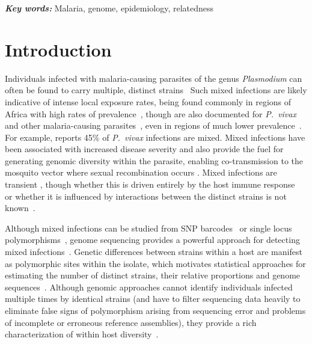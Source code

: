 \documentclass[9pt,lineno]{elife}
\providecommand{\keywords}[1]{\textbf{\textit{Key words:}} #1}
\begin{document}
\keywords{Malaria, genome, epidemiology, relatedness}


\section{Introduction}


Individuals infected with malaria-causing parasites of the genus {\it Plasmodium} can often be found to carry multiple, distinct strains~\citep{Bell2006}  Such mixed infections are likely indicative of intense local exposure rates, being found commonly in regions of Africa with high rates of prevalence~\citep{Bhatt2015, Howes2016}, though are also documented for {\it P.~vivax} and other malaria-causing parasites~\citep{Mueller2007, Collins2012}, even in regions of much lower prevalence~\citep{Howes2016, Steenkeste2010}.  For example, \citet{Pearson2016} reports 45\% of {\it P.~vivax} infections are mixed.  Mixed infections have been associated with increased disease severity \citep{deRoode2005} and also provide the fuel for generating genomic diversity within the parasite, enabling co-transmission to the mosquito vector where sexual recombination occurs \citep{Mzilahowa2007}.  Mixed infections are transient \citep{Bruce2002, Zimmerman2004}, though whether this is driven entirely by the host immune response~\citep{Borrmann2011} or whether it is influenced by interactions between the distinct strains is not known~\citep{Enosse2006, Bushman2016}.

Although mixed infections can be studied from SNP barcodes~\citep{Galinsky2015} or single locus polymorphisms~\citep{Jack2016}, genome sequencing provides a powerful approach for detecting mixed infections~\citep{Chang2017}.  Genetic differences between strains within a host are manifest as polymorphic sites within the isolate, which motivates statistical approaches for estimating the number of distinct strains, their relative proportions and genome sequences~\citep{Zhu2017}.  Although genomic approaches cannot identify individuals infected multiple times by identical strains (and have to filter sequencing data heavily to eliminate false signs of polymorphism arising from sequencing error and problems of incomplete or erroneous reference assemblies), they provide a rich characterization of within host diversity~\citep{Manske2012}.
\end{document}
